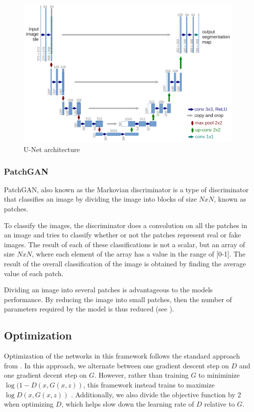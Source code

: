 \documentclass[peerreview]{IEEEtran}
\begin{document}

\begin{figure}[t]
\centering
\includegraphics[width=0.8\columnwidth]{u-net-architecture.png} 
\caption{U-Net architecture \cite{olaf2015unetimage}}
\label{fig:U-Net}
\end{figure}

\subsubsection{PatchGAN}
PatchGAN, also known as the Markovian discriminator is a type of discriminator that classifies an image by dividing the image into blocks of size $NxN$, known as patches.

To classify the images, the discriminator does a convolution on all the patches in an image and tries to classify whether or not the patches represent real or fake images. The result of each of these classifications is not a scalar, but an array of size $NxN$, where each element of the array has a value in the range of [0-1]. The result of the overall classification of the image is obtained by finding the average value of each patch.

Dividing an image into several patches is advantageous to the models performance. By reducing the image into small patches, then the number of parameters required by the model is thus reduced (see \cite{isola2017image}).


\subsection{Optimization}
Optimization of the networks in this framework follows the standard approach from \cite{goodfellow2014generative}. In this approach, we alternate between one gradient descent step on $D$ and one gradient decent step on $G$. However, rather than training $G$ to miniminize $\log (1-D(x, G(x,z))$, this framework instead trains to maximize $\log D(x, G(x, z))$ \cite{isola2017image}. Additionally, we also divide the objective function by 2 when optimizing $D$, which helps slow down the learning rate of $D$ relative to $G$.
\end{document}
